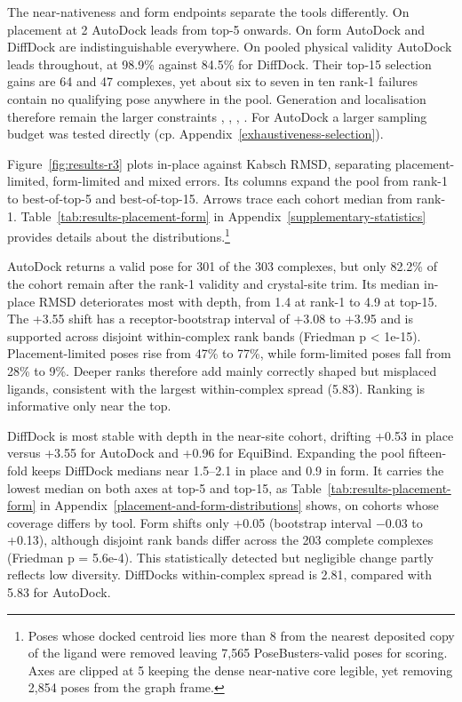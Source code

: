 The near-nativeness and form endpoints separate the tools differently. On placement at 2\angstrom{} AutoDock leads from top-5 onwards. On form AutoDock and DiffDock are indistinguishable everywhere. On pooled physical validity AutoDock leads throughout, at 98.9\% against 84.5\% for DiffDock. Their top-15 selection gains are 64 and 47 complexes, yet about six to seven in ten rank-1 failures contain no qualifying pose anywhere in the pool. Generation and localisation therefore remain the larger constraints \cite{ref003}, \cite{ref013}, \cite{ref024}, \cite{ref035}. For AutoDock a larger sampling budget was tested directly (cp. Appendix~\ref{exhaustiveness-selection}).

Figure~\ref{fig:results-r3} plots in-place against Kabsch RMSD, separating placement-limited, form-limited and mixed errors. Its columns expand the pool from rank-1 to best-of-top-5 and best-of-top-15. Arrows trace each cohort median from rank-1. Table~\ref{tab:results-placement-form} in Appendix~\ref{supplementary-statistics} provides details about the distributions.\footnote{Poses whose docked centroid lies more than 8\angstrom{} from the nearest deposited copy of the ligand were removed leaving 7,565 PoseBusters-valid poses for scoring. Axes are clipped at 5\angstrom{} keeping the dense near-native core legible, yet removing 2,854 poses from the graph frame.}

AutoDock returns a valid pose for 301 of the 303 complexes, but only 82.2\% of the cohort remain after the rank-1 validity and crystal-site trim. Its median in-place RMSD deteriorates most with depth, from 1.4\angstrom{} at rank-1 to 4.9\angstrom{} at top-15. The +3.55\angstrom{} shift has a receptor-bootstrap interval of +3.08 to +3.95\angstrom{} and is supported across disjoint within-complex rank bands (Friedman p \textless{} 1e-15). Placement-limited poses rise from 47\% to 77\%, while form-limited poses fall from 28\% to 9\%. Deeper ranks therefore add mainly correctly shaped but misplaced ligands, consistent with the largest within-complex spread (5.83\angstrom{}). Ranking is informative only near the top.

DiffDock is most stable with depth in the near-site cohort, drifting +0.53\angstrom{} in place versus +3.55\angstrom{} for AutoDock and +0.96\angstrom{} for EquiBind. Expanding the pool fifteen-fold keeps DiffDock medians near 1.5--2.1\angstrom{} in place and 0.9\angstrom{} in form. It carries the lowest median on both axes at top-5 and top-15, as Table~\ref{tab:results-placement-form} in Appendix~\ref{placement-and-form-distributions} shows, on cohorts whose coverage differs by tool. Form shifts only +0.05\angstrom{} (bootstrap interval \ensuremath{-}0.03 to +0.13\angstrom{}), although disjoint rank bands differ across the 203 complete complexes (Friedman p = 5.6e-4). This statistically detected but negligible change partly reflects low diversity. DiffDock\textquotesingle s within-complex spread is 2.81\angstrom{}, compared with 5.83\angstrom{} for AutoDock.

